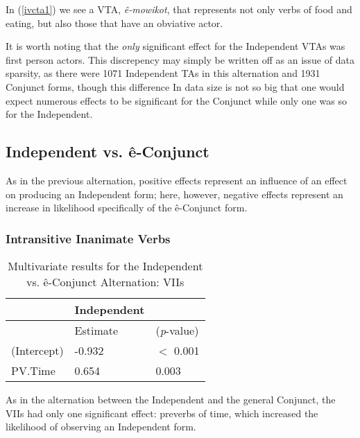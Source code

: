  In (\ref{ivcta1}) we see a VTA, \textit{ê-mowikot}, that represents not only verbs of food and eating, but also those that have an obviative actor.
 
 It is worth noting that the \textit{only} significant effect for the Independent VTAs was first person actors. This discrepency may simply be written off as an issue of data sparsity, as there were 1071 Independent TAs in this alternation and 1931 Conjunct forms, though this difference In data size is not so big that one would expect numerous effects to be significant for the Conjunct while only one was so for the Independent. 
    

\FloatBarrier

\subsection{Independent vs. ê-Conjunct}
As in the previous alternation, positive effects represent an influence of an effect on producing an Independent form; here, however, negative effects represent an increase in likelihood specifically of the ê-Conjunct form.

    \subsubsection{Intransitive Inanimate Verbs}
            \begin{table}[H]
            \centering
            \begin{tabular}{lll}
            \toprule
                                    & \textbf{Independent} & \\
                    \midrule
                                & Estimate    & (\textit{p}-value) \\
            \midrule
(Intercept) & -0.932 & $<$ 0.001 \\
PV.Time & 0.654 & 0.003 \\

            \bottomrule
            \end{tabular}
            \caption{
               Multivariate results for the Independent vs. ê-Conjunct Alternation: VIIs \\ \label{tab:tiivcmv}
              }
            \end{table}
            
            As in the alternation between the Independent and the general Conjunct, the VIIs had only one significant effect: preverbs of time, which increased the likelihood of observing an Independent form. 
            
